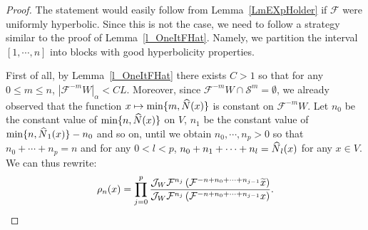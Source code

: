 \documentclass[AHL, Unicode, longabstracts,published]{cedram}
\newcommand{\cm}{\mathcal{F}}
\newcommand{\singPrivate}{\mathcal{S}}
\newcommand{\sing}[1]{\singPrivate^{#1}}
\newcommand{\adm}{_{\alpha^{+}}}
\newcommand{\Np}{\hat N}
\newcommand{\tx}{\tilde{x}}
\newcommand{\jac}[1]{\mathcal{J}_{#1}}
\newcommand{\jacW}{\jac{W}}
\renewcommand{\adm}{_{\alpha}}
\let\oldtilde\tilde
\renewcommand*{\tilde}[1]{\mathchoice{\widetilde{#1}}{\widetilde{#1}}{\oldtilde{#1}}{\oldtilde{#1}}}
\let\oldhat\hat
\renewcommand*{\hat}[1]{\mathchoice{\widehat{#1}}{\widehat{#1}}{\oldhat{#1}}{\oldhat{#1}}}
\begin{document}
\begin{proof}
The statement would easily follow from Lemma~\ref{LmEXpHolder} if $\cm$ were uniformly hyperbolic. Since this is not the case, we need to follow a strategy similar to the proof of Lemma~\ref{l_OneItFHat}. Namely, we partition the interval $[1,\cdots, n]$ into blocks with good hyperbolicity properties.

First of all, by Lemma~\ref{l_OneItFHat} there exists $C > 1$ so that for any $0\le m\le n$, $|\cm^{-m}W|\adm < CL$. Moreover, since $\cm^{-m}W\cap \sing m = \emptyset$, we already observed that the function $x\mapsto\min\{m,\Np(x)\}$ is constant on $\cm^{-m}W$. Let $n_0$ be the constant value of $\min\{n,\Np(x)\}$ on $V$, $n_1$ be the constant value of $\min\{n,\Np_{1}(x)\}-n_{0}$ and so on, until we obtain $n_{0},\cdots, n_{p} > 0$ so that $n_{0}+\cdots+n_{p} = n$ and for any $0 < l < p$, $n_{0}+n_{1}+\cdots+n_{l} = \Np_{l}(x)$ for any $x\in V$. We can thus rewrite:
\begin{align*}
\rho_{n}(x) = \prod_{j = 0}^{p}\frac {\jacW\cm^{n_{j}}\left(\cm^{-n+n_{0}+\cdots+n_{j-1}}\tx\right)} {\jacW\cm^{n_{j}}\left(\cm^{-n+n_{0}+\cdots+n_{j-1}}x\right)}.
\end{align*}


\end{proof}
\end{document}
